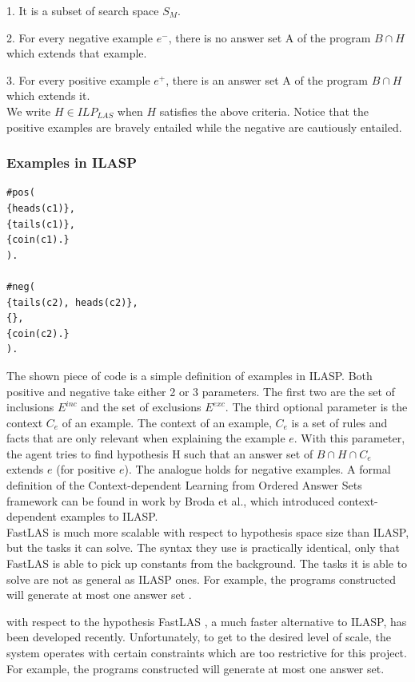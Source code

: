 1. It is a subset of search space $S_M$.

2. For every negative example $e^-$, there is no answer set A of the program $B \cap H$ which extends that example.

3. For every positive example $e^+$, there is an answer set A of the program $B \cap H$ which extends it.
\\

We write $H \in ILP_{LAS}$ when $H$ satisfies the above criteria.
Notice that the positive examples are bravely entailed while the negative are cautiously entailed.
\\

\subsubsection{Examples in ILASP}
\label{examples-in-ilasp}

\begin{verbatim}
#pos(
{heads(c1)},
{tails(c1)},
{coin(c1).}
).

#neg(
{tails(c2), heads(c2)},
{},
{coin(c2).}
).
\end{verbatim}

The shown piece of code is a simple definition of examples in ILASP. 
Both positive and negative take either 2 or 3 parameters. The first two are the set of inclusions $E^{inc}$ and the set of exclusions $E^{exc}$.
The third optional parameter is the context $C_e$ of an example.
The context of an example, $C_e$ is a set of rules and facts that are only relevant when explaining the example $e$.
With this parameter, the agent tries to find hypothesis H such that an answer set of $B \cap H \cap C_e$ extends $e$ (for positive $e$).
The analogue holds for negative examples. 
A formal definition of the Context-dependent Learning from Ordered Answer Sets framework can be found in work by Broda et al., \cite{RefWorks:RefID:56-broda2016iterative} which introduced context-dependent examples to ILASP. \\

FastLAS is much more scalable with respect to hypothesis space size than ILASP, but the tasks it can solve.
The syntax they use is practically identical, only that FastLAS is able to pick up constants from the background.
The tasks it is able to solve are not as general as ILASP ones. 
For example, the programs constructed will generate at most one answer set \cite{RefWorks:RefID:19-law2020fastlas:}.

with respect to the hypothesis 
FastLAS \cite{RefWorks:RefID:19-law2020fastlas:}, a much faster alternative to ILASP, has been developed recently.
Unfortunately, to get to the desired level of scale, the system operates with certain constraints which are too restrictive for this project.
For example, the programs constructed will generate at most one answer set.

